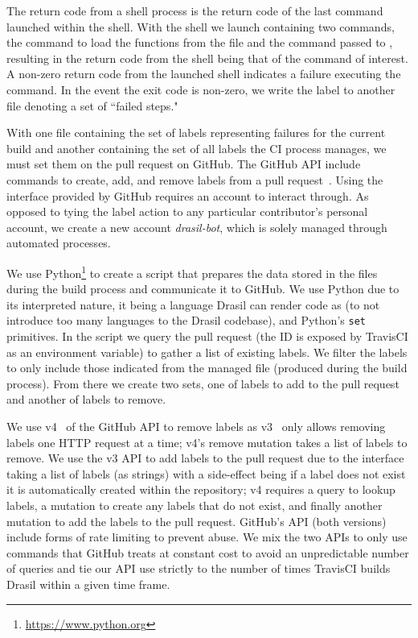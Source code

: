 {{{{{The return code from a shell process is the return code of the last command launched within the shell. With the shell we launch containing two commands, the command to load the functions from the file and the command passed to , resulting in the return code from the shell being that of the command of interest. A non-zero return code from the launched shell indicates a failure executing the command. In the event the exit code is non-zero, we write the label to another file denoting a set of ``failed steps."

With one file containing the set of labels representing failures for the current build and another containing the set of all labels the CI process manages, we must set them on the pull request on GitHub. The GitHub API include commands to create, add, and remove labels from a pull request~\cite{GraphQLAPI}\cite{RestAPI}. Using the interface provided by GitHub requires an account to interact through. As opposed to tying the label action to any particular contributor's personal account, we create a new account \textit{drasil-bot}, which is solely managed through automated processes. 

We use Python\footnote{\url{https://www.python.org}} to create a script that prepares the data stored in the files during the build process and communicate it to GitHub. We use Python due to its interpreted nature, it being a language Drasil can render code as (to not introduce too many languages to the Drasil codebase), and Python's \texttt{set} primitives. In the script we query the pull request (the ID is exposed by TravisCI as an environment variable) to gather a list of existing labels. We filter the labels to only include those indicated from the managed file (produced during the build process). From there we create two sets, one of labels to add to the pull request and another of labels to remove.

We use v4~\cite{GraphQLAPI} of the GitHub API to remove labels as v3~\cite{RestAPI} only allows removing labels one HTTP request at a time; v4's remove mutation takes a list of labels to remove. We use the v3 API to add labels to the pull request due to the interface taking a list of labels (as strings) with a side-effect being if a label does not exist it is automatically created within the repository; v4 requires a query to lookup labels, a mutation to create any labels that do not exist, and finally another mutation to add the labels to the pull request. GitHub's API (both versions) include forms of rate limiting to prevent abuse. We mix the two APIs to only use commands that GitHub treats at constant cost to avoid an unpredictable number of queries and tie our API use strictly to the number of times TravisCI builds Drasil within a given time frame.

}}}}}
